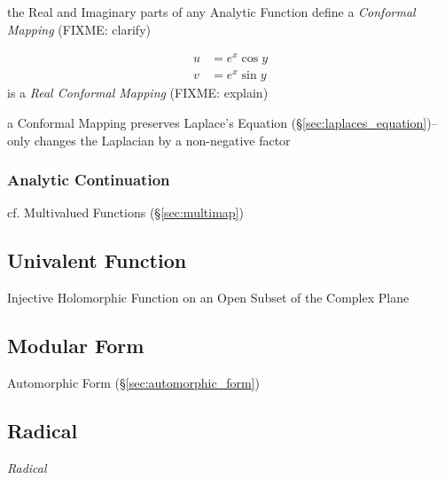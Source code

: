 the Real and Imaginary parts of any Analytic Function define a \emph{Conformal
  Mapping} (FIXME: clarify)

\begin{align*}
  u & = e^x \cos y \\
  v & = e^x \sin y
\end{align*}
is a \emph{Real Conformal Mapping} (FIXME: explain)

a Conformal Mapping preserves Laplace's Equation
(\S\ref{sec:laplaces_equation})-- only changes the Laplacian by a non-negative
factor



\subsubsection{Analytic Continuation}\label{sec:analytic_continuation}

cf. Multivalued Functions (\S\ref{sec:multimap})



\subsection{Univalent Function}\label{sec:univalent_function}

Injective Holomorphic Function on an Open Subset of the Complex Plane



\subsection{Modular Form}\label{sec:modular_form}

Automorphic Form (\S\ref{sec:automorphic_form})



\subsection{Radical}\label{sec:radical}

\emph{Radical}

